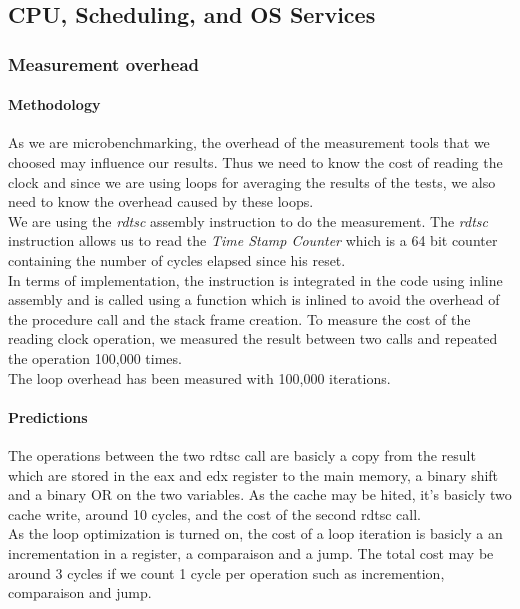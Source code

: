 \subsection{CPU, Scheduling, and OS Services}

\subsubsection{Measurement overhead}

\paragraph{Methodology}
As we are microbenchmarking, the overhead of the measurement tools that we
choosed may influence our results. Thus we need to know the cost of reading
the clock and since we are using loops for averaging the results of the tests, we
also need to know the overhead caused by these loops.\\
We are using the \emph{rdtsc} assembly instruction to do the measurement.
The \emph{rdtsc} instruction allows us to read the \emph{Time Stamp Counter}
which is a 64 bit counter containing the number of cycles elapsed since his
reset.\\
In terms of implementation, the instruction is integrated in the code using
inline assembly and is called using a function which is inlined to avoid the
overhead of the procedure call and the stack frame creation.
To measure the cost of the reading clock operation, we measured the result between
two calls and repeated the operation 100,000 times.\\
The loop overhead has been measured with 100,000 iterations.

\paragraph{Predictions}
The operations between the two rdtsc call are basicly a copy from the result
which are stored in the eax and edx register to the main memory, a binary shift
and a binary OR on the two variables.
As the cache may be hited, it's basicly two cache write, around 10 cycles, and
the cost of the second rdtsc call.\\

As the loop optimization is turned on, the cost of a loop iteration is basicly a
an incrementation in a register, a comparaison and a jump.
The total cost may be around 3 cycles if we count 1 cycle per operation such as
incremention, comparaison and jump.\\

